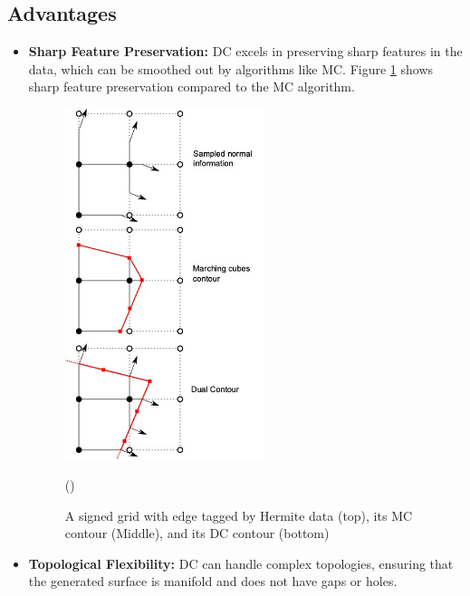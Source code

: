 \subsection{Advantages}
\begin{itemize}
\item \textbf{Sharp Feature Preservation:} DC excels in preserving sharp features in the data, which can be smoothed out by algorithms like MC. Figure \ref{fig:DC-MC-compare} shows sharp feature preservation compared to the MC algorithm.

\begin{figure}
\centering
\includegraphics[height=0.95\textwidth, width=0.55\textwidth]{Figures/DC-MC-compare.jpg}
\decoRule
\caption{A signed grid with edge tagged by Hermite data (top), its MC contour (Middle), and its DC contour (bottom)}(\cite{Ju_2002})
\label{fig:DC-MC-compare}
\end{figure}

\item \textbf{Topological Flexibility:} DC can handle complex topologies, ensuring that the generated surface is manifold and does not have gaps or holes.
\end{itemize}

